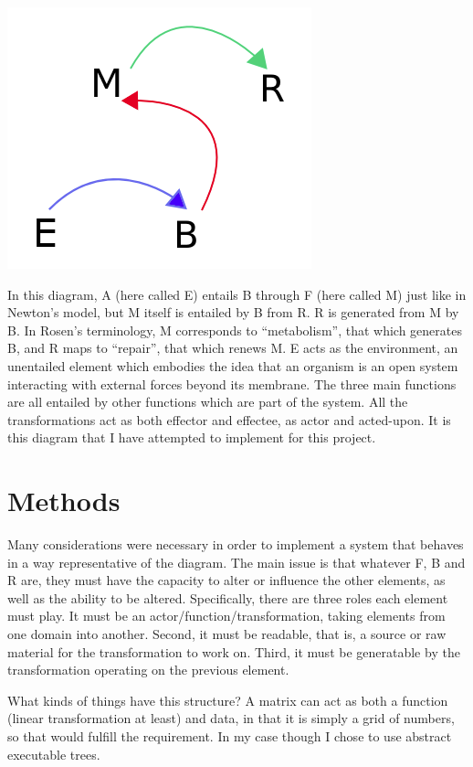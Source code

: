 \documentclass[12pt]{article}
\begin{document}
\begin{center}
\includegraphics[scale=0.6]{rosen.png}
\end{center}

In this diagram, A (here called E) entails B through F (here called M) just like in Newton's model, but M itself is entailed by B from R.  R is generated from M by B.  In Rosen's terminology, M corresponds to ``metabolism'', that which generates B, and R maps to ``repair'', that which renews M.  E acts as the environment, an unentailed element which embodies the idea that an organism is an open system interacting with external forces beyond its membrane.  The three main functions are all entailed by other functions which are part of the system.  All the transformations act as both effector and effectee, as actor and acted-upon.  It is this diagram that I have attempted to implement for this project.

\section{Methods}

Many considerations were necessary in order to implement a system that behaves in a way representative of the diagram.  The main issue is that whatever F, B and R are, they must have the capacity to alter or influence the other elements, as well as the ability to be altered.  Specifically, there are three roles each element must play.  It must be an actor/function/transformation, taking elements from one domain into another.  Second, it must be readable, that is, a source or raw material for the transformation to work on.  Third, it must be generatable by the transformation operating on the previous element.  

What kinds of things have this structure?  A matrix can act as both a function (linear transformation at least) and data, in that it is simply a grid of numbers, so that would fulfill the requirement.  In my case though I chose to use abstract executable trees.  
\end{document}
